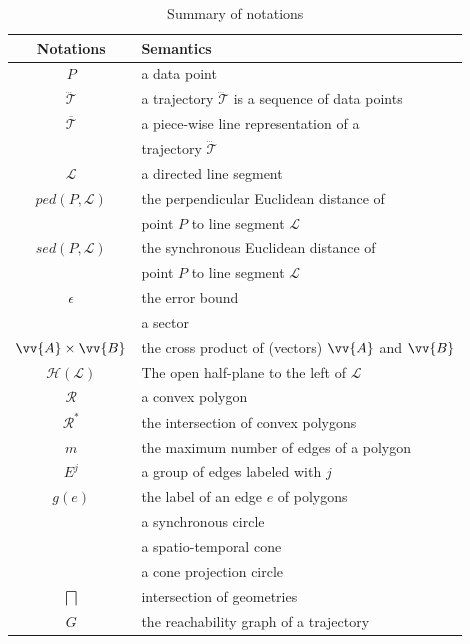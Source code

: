\begin{table}
	\renewcommand{\arraystretch}{1.35}
	\caption{\small Summary of notations}
	\centering
	\footnotesize
	\begin{tabular}{|c|l|}
		\hline
		{\bf Notations}& {\bf Semantics}   \\
		\hline %
		$P$ & a data point \\
		\hline
		$\dddot{\mathcal{T}}$ & a trajectory $\dddot{\mathcal{T}}$ is a sequence of data points\\
		\hline
		$\overline{\mathcal{T}}$&  {a piece-wise line representation of a }	\\
								& trajectory $\dddot{\mathcal{T}}$		\\
		\hline
		$\mathcal{L}$ & a directed line segment  \\
		\hline
		$ped(P, \mathcal{L})$ &  {the perpendicular Euclidean distance of }	\\
								& point $P$ to line segment $\mathcal{L}$	\\
		\hline
		$sed(P, \mathcal{L})$ & {the synchronous Euclidean distance of }	\\
								& point $P$ to line segment $\mathcal{L}$	\\
		\hline
		$\epsilon$ & the error bound \\
		\hline
		\sector{} & a sector \\
		\hline
		$\vv{A} \times \vv{B}$ & the cross product of (vectors) $\vv{A}$ and $\vv{B}$\\
		\hline
		$\mathcal{H}(\mathcal{L})$ & The open half-plane to the left of $\mathcal{L}$ \\
		\hline
		$\mathcal{R}$& a convex polygon \\
		\hline
		$\mathcal{R}^*$ & the intersection of convex polygons \\
		\hline
		$m$ & the maximum number of edges of a polygon\\
		\hline
		$E^j$ & a group of edges labeled with $j$\\
		\hline
		$g(e)$ & the label of an edge $e$ of polygons \\
		\hline
		\circle{} & a synchronous circle\\
		\hline
		\cone{} & a spatio-temporal cone \\
		\hline
		\pcircle{} & a cone projection circle \\
		\hline
		$\bigsqcap$ & intersection of geometries\\
		\hline
		$G$ &	the reachability graph of a trajectory\\
		\hline
	\end{tabular}
	\label{tab:notations}
	\vspace{-1ex}
\end{table}


